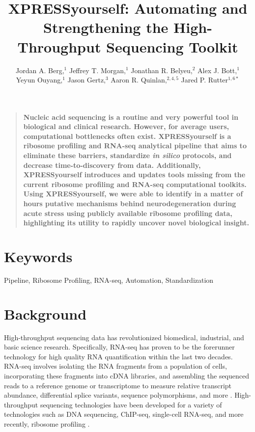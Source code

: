 \documentclass[11pt, a4paper, oneside]{article}
\title{
XPRESSyourself: Automating and Strengthening the High-Throughput Sequencing Toolkit
}
\author{
Jordan A. Berg,$^{1}$ Jeffrey T. Morgan,$^{1}$ Jonathan R. Belyeu,$^{2}$ Alex J. Bott,$^{1}$\\
Yeyun Ouyang,$^{1}$ Jason Gertz,$^{3}$ Aaron R. Quinlan,$^{2,4,5}$ Jared P. Rutter$^{1,6\ast}$\\
}
\date{}
\newenvironment{sciabstract}{%
\begin{quote} \bf}
{\end{quote}}
\begin{document}
\baselineskip24pt

\maketitle



\begin{sciabstract}
Nucleic acid sequencing is a routine and very powerful tool in biological and clinical research. However, for average users, computational bottlenecks often exist. XPRESSyourself is a ribosome profiling and RNA-seq analytical pipeline that aims to eliminate these barriers, standardize \textit{in silico} protocols, and decrease time-to-discovery from data. Additionally, XPRESSyourself introduces and updates tools missing from the current ribosome profiling and RNA-seq computational toolkits. Using XPRESSyourself, we were able to identify in a matter of hours putative mechanisms behind neurodegeneration during acute stress using publicly available ribosome profiling data, highlighting its utility to rapidly uncover novel biological insight.
\end{sciabstract}

\section*{Keywords}
Pipeline, Ribosome Profiling, RNA-seq, Automation, Standardization

\section{Background}
High-throughput sequencing data has revolutionized biomedical, industrial, and basic science research. Specifically, RNA-seq has proven to be the forerunner technology for high quality RNA quantification within the last two decades. RNA-seq involves isolating the RNA fragments from a population of cells, incorporating these fragments into cDNA libraries, and assembling the sequenced reads to a reference genome or transcriptome to measure relative transcript abundance, differential splice variants, sequence polymorphisms, and more \cite{byron_nrg}. High-throughput sequencing technologies have been developed for a variety of technologies such as DNA sequencing, ChIP-seq, single-cell RNA-seq, and more recently, ribosome profiling \cite{ingolia_science}. \par
\end{document}
